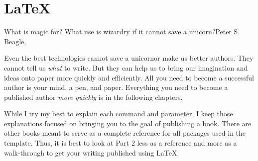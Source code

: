 


\part{LaTeX}\label{latex:prt}

\begin{myquotation}What is magic for? What use is wizardry if it cannot save a unicorn?\mbox{}\hfill\emdash{}Peter S. Beagle, \ifxetex\label{beagle-heroes-quote}\else~\citep[cf. p.~187f]{lastunicorn2}\fi\end{myquotation}

Even the best technologies cannot save a unicorn\emdash{}or make us better authors. They cannot tell us \textit{what} to write. But they can help us to bring our imagination and ideas onto paper more quickly and efficiently. All you need to become a successful author is your mind, a pen, and paper. Everything you need to become a published author \textit{more quickly} is in the following chapters.

While I try my best to explain each command and parameter, I keep those explanations focused on bringing you to the goal of publishing a book. There are other books meant to serve as a complete reference for all packages used in the template. Thus, it is best to look at Part 2 less as a reference and more as a walk-through to get your writing published using LaTeX.